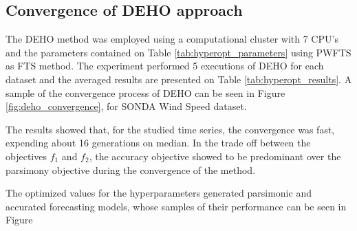 \subsection{Convergence of DEHO approach}
\label{sec:scalability_convergence}

The DEHO method was employed using a computational cluster with 7 CPU's and the parameters contained on Table \ref{tab:hyperopt_parameters} using PWFTS as FTS method. The experiment performed 5 executions of DEHO for each dataset and the averaged results are presented on Table \ref{tab:hyperopt_results}. A sample of the convergence process of DEHO can be seen in Figure \ref{fig:deho_convergence}, for  SONDA Wind Speed dataset. 

The results showed that, for the studied time series, the convergence was fast, expending about 16 generations on median. In the trade off between the objectives $f_1$ and $f_2$, the accuracy objective showed to be predominant over the parsimony objective during the convergence of the method. 

The optimized values for the hyperparameters generated parsimonic and accurated forecasting models, whose samples of their performance can be seen in Figure

